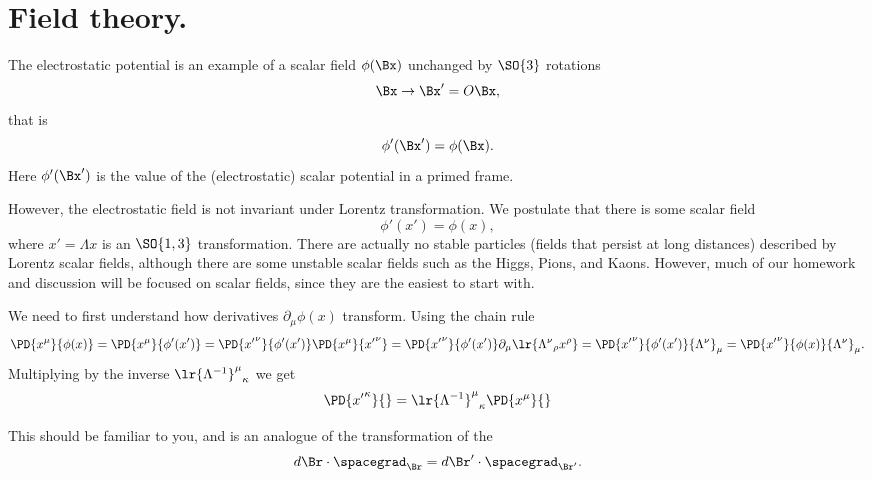 %
%
\section{Field theory.}

The electrostatic potential is an example of a scalar field \( \phi(\Bx) \) unchanged by \(\SO{3}\) rotations
\begin{equation}\label{eqn:qftLecture3:240}
\Bx \rightarrow \Bx' = O \Bx,
\end{equation}
that is
\begin{dmath}\label{eqn:qftLecture3:260}
\phi'(\Bx') = \phi(\Bx).
\end{dmath}
Here \( \phi'(\Bx') \) is the value of the (electrostatic) scalar potential in a primed frame.

However, the electrostatic field is not invariant under Lorentz transformation.
We postulate that there is some scalar field
\begin{dmath}\label{eqn:qftLecture3:280}
\phi'(x') = \phi(x),
\end{dmath}
where \( x' = \Lambda x \) is an \(\SO{1,3}\) transformation.
There are actually no stable particles (fields that persist at long distances) described by Lorentz scalar fields, although there are some unstable scalar fields such as the
Higgs, Pions, and Kaons.
However,
much of our homework and discussion will be focused on scalar fields, since
they are the
easiest to start with.

We need to first understand how derivatives \( \partial_\mu \phi(x) \) transform.  Using the chain rule
\begin{dmath}\label{eqn:qftLecture3:300}
\PD{x^\mu}{\phi(x)} =
\PD{x^\mu}{\phi'(x')}
=
\PD{{x'}^\nu}{\phi'(x')}
\PD{{x}^\mu}{{x'}^\nu}
=
\PD{{x'}^\nu}{\phi'(x')}
\partial_\mu \lr{
{\Lambda^\nu}_\rho x^\rho
}
=
\PD{{x'}^\nu}{\phi'(x')}
{\Lambda^\nu}_\mu
=
\PD{{x'}^\nu}{\phi(x)}
{\Lambda^\nu}_\mu.
\end{dmath}
Multiplying by the inverse \( {\lr{\Lambda^{-1}}^\mu}_\kappa \) we get
\begin{dmath}\label{eqn:qftLecture3:320}
\PD{{x'}^\kappa}{}
=
{\lr{\Lambda^{-1}}^\mu}_\kappa \PD{x^\mu}{}
\end{dmath}

This should be familiar to you, and is an analogue of the transformation of the
\begin{dmath}\label{eqn:qftLecture3:340}
d\Br \cdot \spacegrad_\Br
=
d\Br' \cdot \spacegrad_{\Br'}.
\end{dmath}


